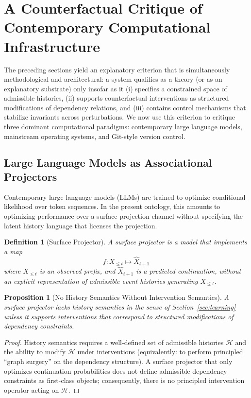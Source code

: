 \documentclass[11pt]{article}
\newtheorem{definition}{Definition}
\newtheorem{proposition}{Proposition}
\begin{document}
\section{A Counterfactual Critique of Contemporary Computational Infrastructure}
\label{sec:critique_infrastructure}

The preceding sections yield an explanatory criterion that is simultaneously methodological and architectural: a system qualifies as a theory (or as an explanatory substrate) only insofar as it (i) specifies a constrained space of admissible histories, (ii) supports counterfactual interventions as structured modifications of dependency relations, and (iii) contains control mechanisms that stabilize invariants across perturbations. We now use this criterion to critique three dominant computational paradigms: contemporary large language models, mainstream operating systems, and Git-style version control.

\subsection{Large Language Models as Associational Projectors}

Contemporary large language models (LLMs) are trained to optimize conditional likelihood over token sequences. In the present ontology, this amounts to optimizing performance over a surface projection channel without specifying the latent history language that licenses the projection.

\begin{definition}[Surface Projector]
A \emph{surface projector} is a model that implements a map
\[
f : X_{\leq t} \mapsto \widehat{X}_{t+1}
\]
where $X_{\leq t}$ is an observed prefix, and $\widehat{X}_{t+1}$ is a predicted continuation, without an explicit representation of admissible event histories generating $X_{\leq t}$.
\end{definition}

\begin{proposition}[No History Semantics Without Intervention Semantics]
A surface projector lacks history semantics in the sense of Section~\ref{sec:learning} unless it supports interventions that correspond to structured modifications of dependency constraints.
\end{proposition}

\begin{proof}
History semantics requires a well-defined set of admissible histories $\mathcal{H}$ and the ability to modify $\mathcal{H}$ under interventions (equivalently: to perform principled ``graph surgery'' on the dependency structure). A surface projector that only optimizes continuation probabilities does not define admissible dependency constraints as first-class objects; consequently, there is no principled intervention operator acting on $\mathcal{H}$.
\end{proof}
\end{document}
